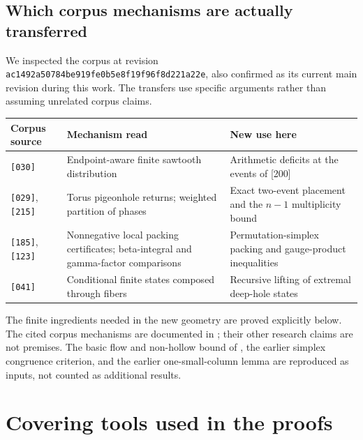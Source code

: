 \documentclass[11pt,a4paper]{article}
\theoremstyle{remark}\newtheorem{remark}[theorem]{Remark}
\begin{document}
\subsection{Which corpus mechanisms are actually transferred}

We inspected the corpus at revision
\texttt{ac1492a50784be919fe0b5e8f19f96f8d221a22e}, also confirmed
as its current main revision during this work. The transfers use
specific arguments rather than assuming unrelated corpus claims.

\begin{center}\small
\begin{tabularx}{\linewidth}{@{}>{\raggedright\arraybackslash}p{.19\linewidth}
 >{\raggedright\arraybackslash}X >{\raggedright\arraybackslash}X@{}}
\toprule
Corpus source & Mechanism read & New use here\\
\midrule
\texttt{[030]} & Endpoint-aware finite sawtooth distribution &
Arithmetic deficits at the events of [200]\\
\texttt{[029]}, \texttt{[215]} & Torus pigeonhole returns; weighted partition of phases &
Exact two-event placement and the $n-1$ multiplicity bound\\
\texttt{[185]}, \texttt{[123]} & Nonnegative local packing certificates; beta-integral
and gamma-factor comparisons &
Permutation-simplex packing and gauge-product inequalities\\
\texttt{[041]} & Conditional finite states composed through fibers &
Recursive lifting of extremal deep-hole states\\
\bottomrule
\end{tabularx}
\end{center}

The finite ingredients needed in the new geometry are proved explicitly
below. The cited corpus mechanisms are documented in
\cite{Corpus030,Corpus029,Corpus215,Corpus185,Corpus123,Corpus041};
their other research claims are not premises. The basic flow and
non-hollow bound of \cite{VMRC200}, the earlier simplex congruence
criterion, and the earlier one-small-column lemma are reproduced
as inputs, not counted as additional results.


\section{Covering tools used in the proofs}
\end{document}
